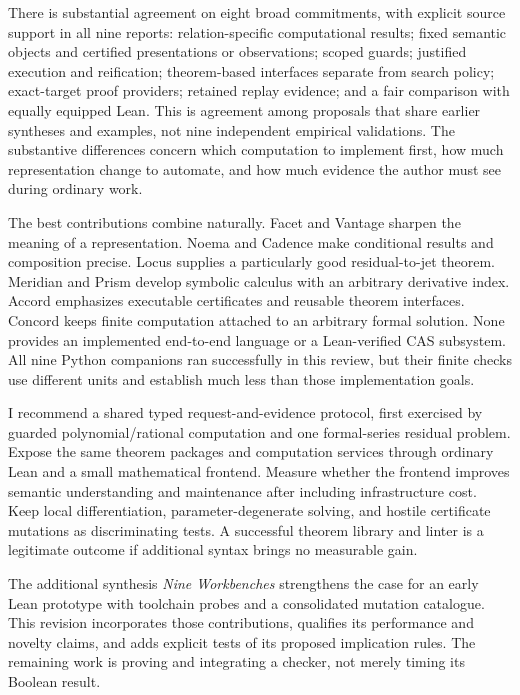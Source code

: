 \documentclass[11pt,letterpaper]{article}
\begin{document}
There is substantial agreement on eight broad commitments, with explicit source
support in all nine reports: relation-specific computational results; fixed
semantic objects and certified presentations or observations; scoped guards;
justified execution and reification; theorem-based interfaces separate from
search policy; exact-target proof providers; retained replay evidence; and a fair
comparison with equally equipped Lean. This is agreement among proposals that
share earlier syntheses and examples, not nine independent empirical validations.
The substantive differences concern which computation to implement first, how
much representation change to automate, and how much evidence the author must
see during ordinary work.

The best contributions combine naturally. Facet and Vantage sharpen the meaning
of a representation. Noema and Cadence make conditional results and composition
precise. Locus supplies a particularly good residual-to-jet theorem. Meridian and
Prism develop symbolic calculus with an arbitrary derivative index. Accord
emphasizes executable certificates and reusable theorem interfaces. Concord
keeps finite computation attached to an arbitrary formal solution. None provides
an implemented end-to-end language or a Lean-verified CAS subsystem. All nine
Python companions ran successfully in this review, but their finite checks use
different units and establish much less than those implementation goals.

I recommend a shared typed request-and-evidence protocol, first exercised by
guarded polynomial/rational computation and one formal-series residual problem.
Expose the same theorem packages and computation services through ordinary Lean
and a small mathematical frontend. Measure whether the frontend improves
semantic understanding and maintenance after including infrastructure cost.
Keep local differentiation, parameter-degenerate solving, and hostile
certificate mutations as discriminating tests. A successful theorem library and
linter is a legitimate outcome if additional syntax brings no measurable gain.

The additional synthesis \emph{Nine Workbenches} strengthens the case for an
early Lean prototype with toolchain probes and a consolidated mutation catalogue.
This revision incorporates those contributions, qualifies its performance and
novelty claims, and adds explicit tests of its proposed implication rules. The
remaining work is proving and integrating a checker, not merely timing its Boolean result.
\end{document}
